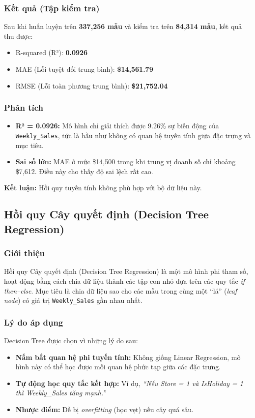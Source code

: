 \subsubsection{Kết quả (Tập kiểm tra)}
Sau khi huấn luyện trên \textbf{337,256 mẫu} và kiểm tra trên \textbf{84,314 mẫu}, kết quả thu được:

\begin{itemize}
    \item R-squared (R²): \textbf{0.0926}
    \item MAE (Lỗi tuyệt đối trung bình): \textbf{\$14,561.79}
    \item RMSE (Lỗi toàn phương trung bình): \textbf{\$21,752.04}
\end{itemize}

\subsubsection{Phân tích}
\begin{itemize}
    \item \textbf{R² = 0.0926:} Mô hình chỉ giải thích được 9.26\% sự biến động của \texttt{Weekly\_Sales}, tức là hầu như không có quan hệ tuyến tính giữa đặc trưng và mục tiêu.
    \item \textbf{Sai số lớn:} MAE ở mức \$14,500 trong khi trung vị doanh số chỉ khoảng \$7,612. Điều này cho thấy độ sai lệch rất cao.
\end{itemize}

\textbf{Kết luận:} Hồi quy tuyến tính không phù hợp với bộ dữ liệu này.

\subsection{Hồi quy Cây quyết định (Decision Tree Regression)}

\subsubsection{Giới thiệu}
Hồi quy Cây quyết định (Decision Tree Regression) là một mô hình phi tham số, hoạt động bằng cách chia dữ liệu thành các tập con nhỏ dựa trên các quy tắc \textit{if–then–else}.  
Mục tiêu là chia dữ liệu sao cho các mẫu trong cùng một “lá” (\textit{leaf node}) có giá trị \texttt{Weekly\_Sales} gần nhau nhất.

\subsubsection{Lý do áp dụng}
Decision Tree được chọn vì những lý do sau:
\begin{itemize}
    \item \textbf{Nắm bắt quan hệ phi tuyến tính:} Không giống Linear Regression, mô hình này có thể học được mối quan hệ phức tạp giữa các đặc trưng.
    \item \textbf{Tự động học quy tắc kết hợp:} Ví dụ, \textit{“Nếu Store = 1 và IsHoliday = 1 thì Weekly\_Sales tăng mạnh.”}
    \item \textbf{Nhược điểm:} Dễ bị \textit{overfitting} (học vẹt) nếu cây quá sâu.
\end{itemize}

